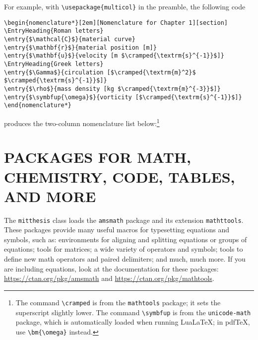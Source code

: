 \documentclass[11pt]{article}
\begin{document}
For example, with \verb+\usepackage{multicol}+ in the preamble, the following code 
\begin{center}
\begin{minipage}{0.85\textwidth}
\begin{verbatim}
\begin{nomenclature*}[2em][Nomenclature for Chapter 1][section]
\EntryHeading{Roman letters}
\entry{$\mathcal{C}$}{material curve}
\entry{$\mathbf{r}$}{material position [m]}
\entry{$\mathbf{u}$}{velocity [m $\cramped{\textrm{s}^{-1}}$]}
\EntryHeading{Greek letters}
\entry{$\Gamma$}{circulation [$\cramped{\textrm{m}^2}$ $\cramped{\textrm{s}^{-1}}$]}
\entry{$\rho$}{mass density [kg $\cramped{\textrm{m}^{-3}}$]}
\entry{$\symbfup{\omega}$}{vorticity [$\cramped{\textrm{s}^{-1}}$]}
\end{nomenclature*}
\end{verbatim}
\end{minipage}
\end{center}
produces the two-column nomenclature list below:\footnote{The command \texttt{\textbackslash cramped} is from the \texttt{mathtools} package; it sets the superscript slightly lower. The command \texttt{\textbackslash symbfup} is from the \texttt{unicode-math} package, which is automatically loaded when running LuaLaTeX; in pdfTeX, use \texttt{\textbackslash bm\{\textbackslash omega\}} instead.}

\begin{nomenclature*}
\end{nomenclature*}


\section{PACKAGES FOR MATH, CHEMISTRY, CODE, TABLES, AND MORE}
The \texttt{mitthesis} class loads the \texttt{amsmath} package and its extension \texttt{mathttools}. These packages provide many useful macros for typesetting equations and symbols, such as: environments for aligning and splitting equations or groups of equations; tools for matrices; a wide variety of operators and symbols; tools to define new math operators and paired delimiters; and much, much more. If you are including equations, look at the documentation for these packages: \url{https://ctan.org/pkg/amsmath} and \url{https://ctan.org/pkg/mathtools}.
\end{document}

